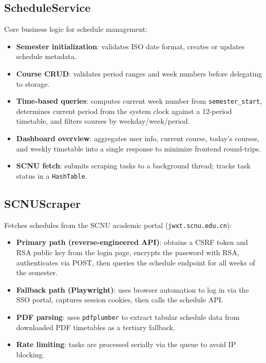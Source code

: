 \documentclass[12pt,a4paper]{article}
\begin{document}
\subsection{ScheduleService}

Core business logic for schedule management:

\begin{itemize}[nosep]
    \item \textbf{Semester initialization}: validates ISO date format, creates or updates schedule metadata.
    \item \textbf{Course CRUD}: validates period ranges and week numbers before delegating to storage.
    \item \textbf{Time-based queries}: computes current week number from \texttt{semester\_start}, determines current period from the system clock against a 12-period timetable, and filters courses by weekday/week/period.
    \item \textbf{Dashboard overview}: aggregates user info, current course, today's courses, and weekly timetable into a single response to minimize frontend round-trips.
    \item \textbf{SCNU fetch}: submits scraping tasks to a background thread; tracks task status in a \texttt{HashTable}.
\end{itemize}

\subsection{SCNUScraper}

Fetches schedules from the SCNU academic portal (\texttt{jwxt.scnu.edu.cn}):

\begin{itemize}[nosep]
    \item \textbf{Primary path (reverse-engineered API)}: obtains a CSRF token and RSA public key from the login page, encrypts the password with RSA, authenticates via POST, then queries the schedule endpoint for all weeks of the semester.
    \item \textbf{Fallback path (Playwright)}: uses browser automation to log in via the SSO portal, captures session cookies, then calls the schedule API.
    \item \textbf{PDF parsing}: uses \texttt{pdfplumber} to extract tabular schedule data from downloaded PDF timetables as a tertiary fallback.
    \item \textbf{Rate limiting}: tasks are processed serially via the queue to avoid IP blocking.
\end{itemize}
\end{document}
